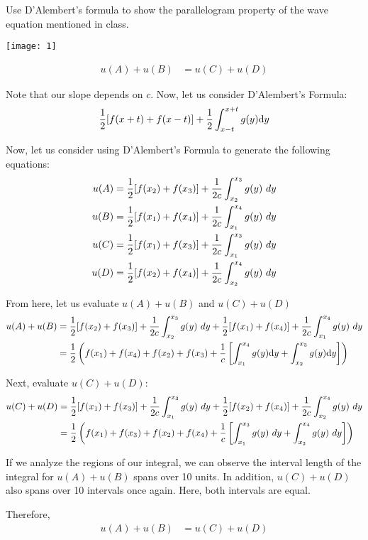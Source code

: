 \item Use D'Alembert's formula to show the parallelogram property of the wave equation mentioned in class.
\bigbreak

\begin{center}
  \texttt{[image: 1]}
\end{center}
%
\begin{align}
  u(A) + u(B) & = u(C) + u(D)
\end{align}

Note that our slope depends on $c$.
Now, let us consider D'Alembert's Formula:
%
\begin{align}
  \frac{1}{2}[f(x + t) + f(x - t)] + \frac{1}{2} \int^{x + t}_{x - t} g(y)
  \text dy
\end{align}

Now, let us consider using D'Alembert's Formula to generate the following equations:
%
\begin{align}
  u(A) & = \frac{1}{2} [f(x_2) + f(x_3)] + \frac{1}{2c} \int^{x_3}_{x_2} g(y) \text\ dy\\
  u(B) & = \frac{1}{2} [f(x_1) + f(x_4)] + \frac{1}{2c} \int^{x_4}_{x_1} g(y) \text\ dy\\
  u(C) & = \frac{1}{2} [f(x_1) + f(x_3)] + \frac{1}{2c} \int^{x_3}_{x_1} g(y) \text\ dy\\
  u(D) & = \frac{1}{2} [f(x_2) + f(x_4)] + \frac{1}{2c} \int^{x_4}_{x_2} g(y) \text\ dy
\end{align}

From here, let us evaluate $u(A) + u(B)$ and $u(C) + u(D)$
%
\begin{align}
  u(A) + u(B) & =
  \frac{1}{2} [f(x_2) + f(x_3)] + \frac{1}{2c} \int^{x_3}_{x_2} g(y) \text\ dy +
  \frac{1}{2} [f(x_1) + f(x_4)] + \frac{1}{2c} \int^{x_4}_{x_1} g(y) \text\ dy\\
  & =
  \frac{1}{2} \left( f(x_1) + f(x_4) + f(x_2) + f(x_3) +
  \frac{1}{c}\left[
  \int^{x_4}_{x_1} g(y) \text dy + \int^{x_3}_{x_2} g(y) \text dy
  \right]\right)
\end{align}

Next, evaluate $u(C) + u(D)$:
%
\begin{align}
  u(C) + u(D) & =
  \frac{1}{2} [f(x_1) + f(x_3)] + \frac{1}{2c} \int^{x_3}_{x_1} g(y) \text\ dy  +
  \frac{1}{2} [f(x_2) + f(x_4)] + \frac{1}{2c} \int^{x_4}_{x_2} g(y) \text\ dy \\
  & = \frac{1}{2}
  \left(
  f(x_1) + f(x_3) + f(x_2) + f(x_4) + \frac{1}{c}
  \left[
  \int^{x_3}_{x_1} g(y) \text\ dy +
  \int^{x_4}_{x_2} g(y) \text\ dy
  \right]
  \right)
\end{align}

If we analyze the regions of our integral, we can observe the interval length of the integral for $u(A) + u(B)$ spans over 10 units. In addition, $u(C) + u(D)$ also spans over 10 intervals once again. Here, both intervals are equal.

Therefore,
%
\begin{align}
  u(A) + u(B) & = u(C) + u(D)
\end{align}
